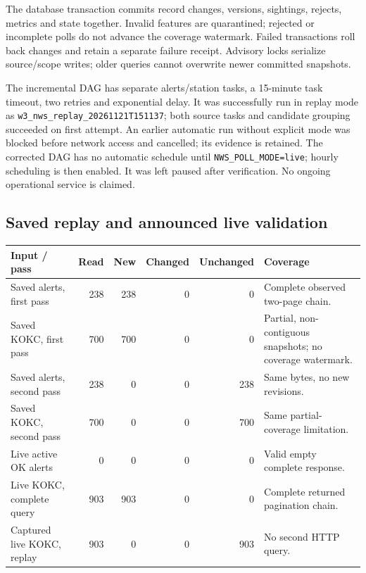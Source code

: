 \documentclass[10pt]{article}
\begin{document}
The database transaction commits record changes, versions, sightings, rejects,
metrics and state together. Invalid features are quarantined; rejected or
incomplete polls do not advance the coverage watermark. Failed transactions
roll back changes and retain a separate failure receipt. Advisory locks serialize
source/scope writes; older queries cannot overwrite newer committed snapshots.

The incremental DAG has separate alerts/station tasks, a 15-minute task timeout,
two retries and exponential delay. It was successfully run in replay mode as
\texttt{w3\_nws\_replay\_20261121T151137}; both source tasks and candidate grouping succeeded on first attempt.
An earlier automatic run without explicit mode was blocked before network access
and cancelled; its evidence is retained. The corrected DAG has no automatic
schedule until \texttt{NWS\_POLL\_MODE=live}; hourly scheduling is then enabled.
It was left paused after verification. No ongoing operational service is claimed.

\subsection{Saved replay and announced live validation}
\begin{tabularx}{\textwidth}{YrrrrY}
\toprule Input / pass & Read & New & Changed & Unchanged & Coverage\\\midrule
Saved alerts, first pass & 238 & 238 & 0 & 0 & Complete observed two-page chain.\\
Saved KOKC, first pass & 700 & 700 & 0 & 0 & Partial, non-contiguous snapshots; no coverage watermark.\\
Saved alerts, second pass & 238 & 0 & 0 & 238 & Same bytes, no new revisions.\\
Saved KOKC, second pass & 700 & 0 & 0 & 700 & Same partial-coverage limitation.\\
Live active OK alerts & 0 & 0 & 0 & 0 & Valid empty complete response.\\
Live KOKC, complete query & 903 & 903 & 0 & 0 & Complete returned pagination chain.\\
Captured live KOKC, replay & 903 & 0 & 0 & 903 & No second HTTP query.\\
\bottomrule
\end{tabularx}
\end{document}
